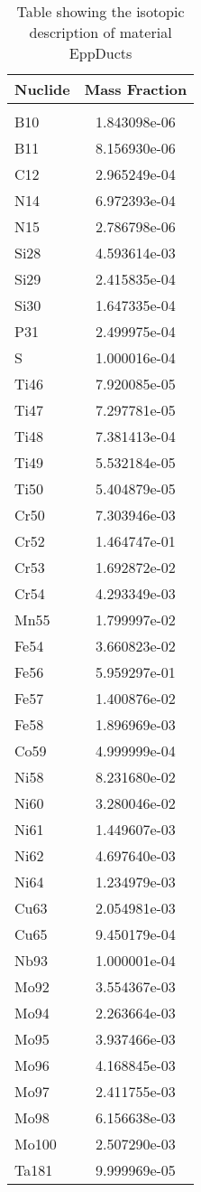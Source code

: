 \begin{centering}
\begin{table}[ht!]
\begin{tabular}{l | c}
\hline
Nuclide & Mass Fraction\\
\hline
\\
B10 & 1.843098e-06\\
B11 & 8.156930e-06\\
C12 & 2.965249e-04\\
N14 & 6.972393e-04\\
N15 & 2.786798e-06\\
Si28 & 4.593614e-03\\
Si29 & 2.415835e-04\\
Si30 & 1.647335e-04\\
P31 & 2.499975e-04\\
S & 1.000016e-04\\
Ti46 & 7.920085e-05\\
Ti47 & 7.297781e-05\\
Ti48 & 7.381413e-04\\
Ti49 & 5.532184e-05\\
Ti50 & 5.404879e-05\\
Cr50 & 7.303946e-03\\
Cr52 & 1.464747e-01\\
Cr53 & 1.692872e-02\\
Cr54 & 4.293349e-03\\
Mn55 & 1.799997e-02\\
Fe54 & 3.660823e-02\\
Fe56 & 5.959297e-01\\
Fe57 & 1.400876e-02\\
Fe58 & 1.896969e-03\\
Co59 & 4.999999e-04\\
Ni58 & 8.231680e-02\\
Ni60 & 3.280046e-02\\
Ni61 & 1.449607e-03\\
Ni62 & 4.697640e-03\\
Ni64 & 1.234979e-03\\
Cu63 & 2.054981e-03\\
Cu65 & 9.450179e-04\\
Nb93 & 1.000001e-04\\
Mo92 & 3.554367e-03\\
Mo94 & 2.263664e-03\\
Mo95 & 3.937466e-03\\
Mo96 & 4.168845e-03\\
Mo97 & 2.411755e-03\\
Mo98 & 6.156638e-03\\
Mo100 & 2.507290e-03\\
Ta181 & 9.999969e-05
\end{tabular}
\caption{Table showing the isotopic description of material EppDucts}
\label{table:material_EppDucts}
\end{table}\clearpage


\end{centering}
